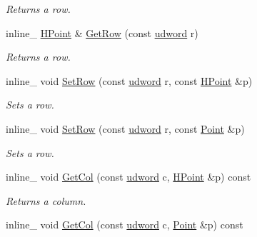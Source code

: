 \begin{DoxyCompactItemize}
\begin{DoxyCompactList}\small\item\em Returns a row. \end{DoxyCompactList}\item 
inline\+\_\+ \hyperlink{classHPoint}{H\+Point} \& \hyperlink{classMatrix4x4_a676a90f9991ea0b7ec6b544ba80af164}{Get\+Row} (const \hyperlink{IceTypes_8h_a44c6f1920ba5551225fb534f9d1a1733}{udword} r)\hypertarget{classMatrix4x4_a676a90f9991ea0b7ec6b544ba80af164}{}\label{classMatrix4x4_a676a90f9991ea0b7ec6b544ba80af164}

\begin{DoxyCompactList}\small\item\em Returns a row. \end{DoxyCompactList}\item 
inline\+\_\+ void \hyperlink{classMatrix4x4_a5e6eb34412992ba88352195ac93732df}{Set\+Row} (const \hyperlink{IceTypes_8h_a44c6f1920ba5551225fb534f9d1a1733}{udword} r, const \hyperlink{classHPoint}{H\+Point} \&p)\hypertarget{classMatrix4x4_a5e6eb34412992ba88352195ac93732df}{}\label{classMatrix4x4_a5e6eb34412992ba88352195ac93732df}

\begin{DoxyCompactList}\small\item\em Sets a row. \end{DoxyCompactList}\item 
inline\+\_\+ void \hyperlink{classMatrix4x4_a6182d58b4005e94820da408be3be75b3}{Set\+Row} (const \hyperlink{IceTypes_8h_a44c6f1920ba5551225fb534f9d1a1733}{udword} r, const \hyperlink{classPoint}{Point} \&p)\hypertarget{classMatrix4x4_a6182d58b4005e94820da408be3be75b3}{}\label{classMatrix4x4_a6182d58b4005e94820da408be3be75b3}

\begin{DoxyCompactList}\small\item\em Sets a row. \end{DoxyCompactList}\item 
inline\+\_\+ void \hyperlink{classMatrix4x4_a98031f98b3ceabda8bb299df1963db72}{Get\+Col} (const \hyperlink{IceTypes_8h_a44c6f1920ba5551225fb534f9d1a1733}{udword} c, \hyperlink{classHPoint}{H\+Point} \&p) const \hypertarget{classMatrix4x4_a98031f98b3ceabda8bb299df1963db72}{}\label{classMatrix4x4_a98031f98b3ceabda8bb299df1963db72}

\begin{DoxyCompactList}\small\item\em Returns a column. \end{DoxyCompactList}\item 
inline\+\_\+ void \hyperlink{classMatrix4x4_ae97452b5679c1efaa91aaf55e9d241a6}{Get\+Col} (const \hyperlink{IceTypes_8h_a44c6f1920ba5551225fb534f9d1a1733}{udword} c, \hyperlink{classPoint}{Point} \&p) const \hypertarget{classMatrix4x4_ae97452b5679c1efaa91aaf55e9d241a6}{}\label{classMatrix4x4_ae97452b5679c1efaa91aaf55e9d241a6}


\end{DoxyCompactItemize}
